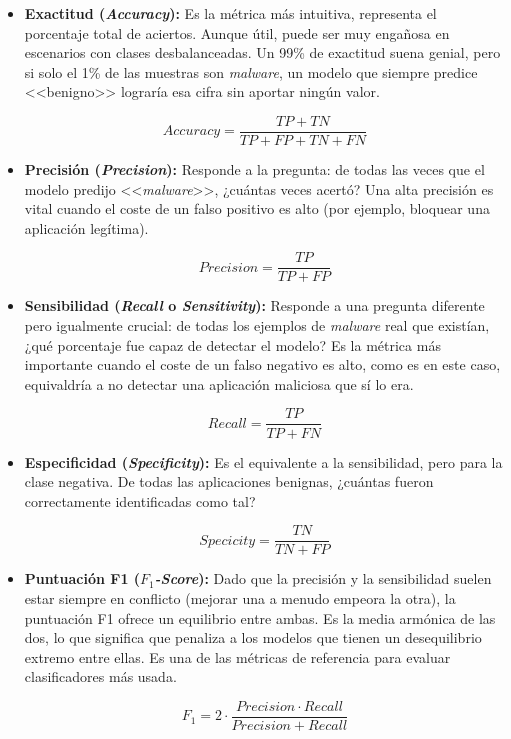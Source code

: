 \begin{itemize}
	\item \textbf{Exactitud (\textit{Accuracy}):} Es la métrica más intuitiva, representa el porcentaje total de aciertos. Aunque útil, puede ser muy engañosa en escenarios con clases desbalanceadas. Un 99\% de exactitud suena genial, pero si solo el 1\% de las muestras son \textit{malware}, un modelo que siempre predice <<benigno>> lograría esa cifra sin aportar ningún valor.

	\[Accuracy =\frac{TP + TN}{TP + FP + TN + FN}\]
	
	\item \textbf{Precisión (\textit{Precision}):} Responde a la pregunta: de todas las veces que el modelo predijo <<\textit{malware}>>, ¿cuántas veces acertó? Una alta precisión es vital cuando el coste de un falso positivo es alto (por ejemplo, bloquear una aplicación legítima).

	\[Precision = \frac{TP}{TP + FP}\]

	\item \textbf{Sensibilidad (\textit{Recall} o \textit{Sensitivity}):} Responde a una pregunta diferente pero igualmente crucial: de todas los ejemplos de \textit{malware} real que existían, ¿qué porcentaje fue capaz de detectar el modelo? Es la métrica más importante cuando el coste de un falso negativo es alto, como es en este caso, equivaldría a no detectar una aplicación maliciosa que sí lo era.
	
	\[Recall = \frac{TP}{TP + FN}\]
	
	\item \textbf{Especificidad (\textit{Specificity}):} Es el equivalente a la sensibilidad, pero para la clase negativa. De todas las aplicaciones benignas, ¿cuántas fueron correctamente identificadas como tal?
	
	\[Specicity = \frac{TN}{TN + FP}\]
	
	\item \textbf{Puntuación F1 (\textit{$F_1$-Score}):} Dado que la precisión y la sensibilidad suelen estar siempre en conflicto (mejorar una a menudo empeora la otra), la puntuación F1 ofrece un equilibrio entre ambas. Es la media armónica de las dos, lo que significa que penaliza a los modelos que tienen un desequilibrio extremo entre ellas. Es una de las métricas de referencia para evaluar clasificadores más usada.
	
	\[F_1 = 2 \cdot \frac{Precision \cdot Recall}{Precision + Recall}\]
	
\end{itemize}

